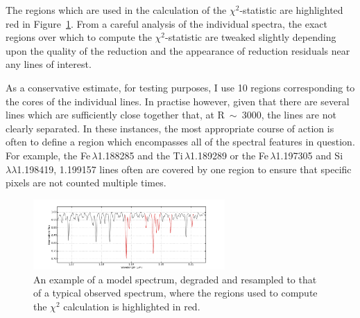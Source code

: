 The regions which are used in the calculation of the $\chi^{2}$-statistic are highlighted red in
Figure~\ref{fig:lines}.
From a careful analysis of the individual spectra, the exact regions over which to compute the $\chi^{2}$-statistic are tweaked slightly depending upon the quality of the reduction and the appearance of reduction residuals near any lines of interest.

As a conservative estimate, for testing purposes, I use 10 regions corresponding to the cores of the individual lines.
In practise however, given that there are several lines which are sufficiently
close together that, at R~$\sim$~3000,
the lines are not clearly separated.
In these instances, the most appropriate course of action is often to define a region which encompasses all of the spectral features in question.
For example, the Fe\,\1$\lambda$1.188285 and the Ti\,\1$\lambda$1.189289
or the Fe\,\1$\lambda$1.197305 and Si\,\1$\lambda\lambda$1.198419, 1.199157 lines often are covered by one region to ensure that specific pixels are not counted multiple times.


\begin{figure}
 \centering
 \includegraphics[width=0.65\textwidth]{JAnal/Diag-lines}
 \caption[Diagnostic lines]{
An example of a model spectrum, degraded and resampled to that of a typical observed spectrum, where the regions used to compute the $\chi^{2}$ calculation is highlighted in red.
\label{fig:lines}
         }
\end{figure}

